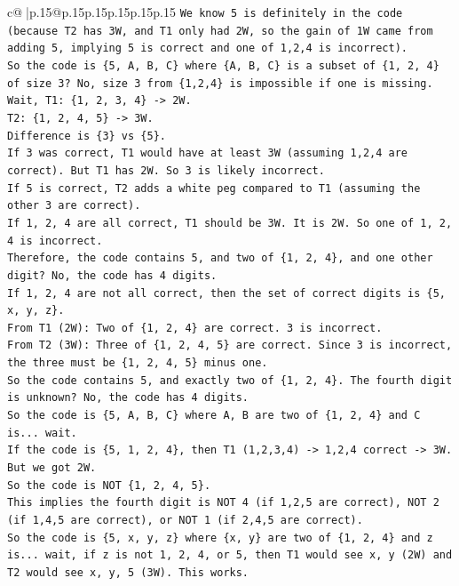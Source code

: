 \documentclass{article}
\begin{document}
{\begin{supertabular}{c@{$\;$}|p{.15\linewidth}@{}p{.15\linewidth}p{.15\linewidth}p{.15\linewidth}p{.15\linewidth}p{.15\linewidth}}
{{{\texttt{We know 5 is definitely in the code (because T2 has 3W, and T1 only had 2W, so the gain of 1W came from adding 5, implying 5 is correct and one of 1,2,4 is incorrect).} \\
\texttt{So the code is \{5, A, B, C\} where \{A, B, C\} is a subset of \{1, 2, 4\} of size 3? No, size 3 from \{1,2,4\} is impossible if one is missing.} \\
\texttt{Wait, T1: \{1, 2, 3, 4\} {-}> 2W.} \\
\texttt{T2: \{1, 2, 4, 5\} {-}> 3W.} \\
\texttt{Difference is \{3\} vs \{5\}.} \\
\texttt{If 3 was correct, T1 would have at least 3W (assuming 1,2,4 are correct). But T1 has 2W. So 3 is likely incorrect.} \\
\texttt{If 5 is correct, T2 adds a white peg compared to T1 (assuming the other 3 are correct).} \\
\texttt{If 1, 2, 4 are all correct, T1 should be 3W. It is 2W. So one of 1, 2, 4 is incorrect.} \\
\texttt{Therefore, the code contains 5, and two of \{1, 2, 4\}, and one other digit? No, the code has 4 digits.} \\
\texttt{If 1, 2, 4 are not all correct, then the set of correct digits is \{5, x, y, z\}.} \\
\texttt{From T1 (2W): Two of \{1, 2, 4\} are correct. 3 is incorrect.} \\
\texttt{From T2 (3W): Three of \{1, 2, 4, 5\} are correct. Since 3 is incorrect, the three must be \{1, 2, 4, 5\} minus one.} \\
\texttt{So the code contains 5, and exactly two of \{1, 2, 4\}. The fourth digit is unknown? No, the code has 4 digits.} \\
\texttt{So the code is \{5, A, B, C\} where A, B are two of \{1, 2, 4\} and C is... wait.} \\
\texttt{If the code is \{5, 1, 2, 4\}, then T1 (1,2,3,4) {-}> 1,2,4 correct {-}> 3W. But we got 2W.} \\
\texttt{So the code is NOT \{1, 2, 4, 5\}.} \\
\texttt{This implies the fourth digit is NOT 4 (if 1,2,5 are correct), NOT 2 (if 1,4,5 are correct), or NOT 1 (if 2,4,5 are correct).} \\
\texttt{So the code is \{5, x, y, z\} where \{x, y\} are two of \{1, 2, 4\} and z is... wait, if z is not 1, 2, 4, or 5, then T1 would see x, y (2W) and T2 would see x, y, 5 (3W). This works.} \\
}}}
\end{supertabular}}
\end{document}
